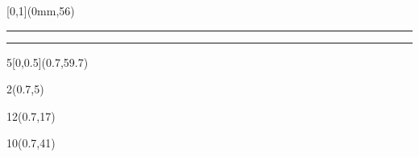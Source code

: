 \begin{frame}[plain]
  \begin{textblock*}{\paperwidth}[0,1](0mm,56\TPVertModule)
    \textcolor{rouge}{\rule{\banderougewidth}{\banderougeheight}}%
    \textcolor{bleu}{\rule{\bandeorwidth}{\bandeorheight}}
  \end{textblock*}

	\begin{textblock*}{5\TPHorizModule}[0,0.5](0.7\TPHorizModule,59.7\TPVertModule)
		\site
	\end{textblock*}

  \begin{textblock*}{2\TPHorizModule}(0.7\TPHorizModule,5\TPVertModule)
    \textcolor[rgb]{0.13,0.13,0.13}{\webinaire}
  \end{textblock*}

  \begin{textblock*}{12\TPHorizModule}(0.7\TPHorizModule,17\TPVertModule)
    \textcolor[rgb]{0.13,0.13,0.13}{\titlefmt}
  \end{textblock*}

  \begin{textblock*}{10\TPHorizModule}(0.7\TPHorizModule,41\TPVertModule)
    \textcolor[rgb]{0.13,0.13,0.13}{\datefmt}
  \end{textblock*}
\end{frame}
\endgroup

